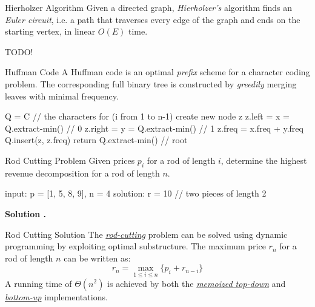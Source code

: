 \documentclass{cognito}
\begin{document}
\begin{note}{Hierholzer Algorithm}
	Given a directed graph, {\it Hierholzer's} algorithm finds an {\it Euler circuit}, i.e.
	 a path that traverses every edge of the graph and ends on the starting vertex,
	in linear $O(E)$ time.
	 \begin{largecode}
 TODO!
	 \end{largecode}
	 \vspace{-5pt}
\end{note}


\begin{note}{Huffman Code}
	A Huffman code is an optimal \emph{prefix} scheme for a character coding problem.
	The corresponding full binary tree is constructed by \emph{greedily} merging leaves with minimal frequency.
	
	\begin{largecode}
 Q = C  // the characters
 for (i from 1 to n-1)
 	create new node z
	z.left = x = Q.extract-min()  // 0
	z.right = y = Q.extract-min() // 1
	z.freq = x.freq + y.freq
	Q.insert(z, z.freq)
 return Q.extract-min()  // root
	\end{largecode}
	\vspace{-5pt}
\end{note}

\begin{note}{Rod Cutting Problem}
	Given prices $p_i$ for a rod of length $i$, determine the highest revenue decomposition for
	a rod of length $n$.
	\begin{largecode}
 input:    p = [1, 5, 8, 9], n = 4
 solution: r = 10  // two pieces of length 2
	\end{largecode}
	\bf Solution \hyperref[note:Rod Cutting Solution]{\solutionref}.
\end{note}

\begin{note}{Rod Cutting Solution}
	The \hyperref[note:Rod Cutting Problem]{\it rod-cutting} problem can be solved using dynamic programming
	by exploiting optimal substructure.
	The maximum price $r_n$ for a rod of length $n$ can be written as:
	$$ r_n = \max_{1 \leq i \leq n} \{ p_i + r_{n-i} \} $$
	A running time of $\Theta(n^2)$ is achieved by both the \hyperref[note:Memoized Rod Cutting]{\it memoized top-down} and
	\hyperref[note:Bottom-Up Rod Cutting]{\it bottom-up} implementations.
	
\end{note}
\end{document}
